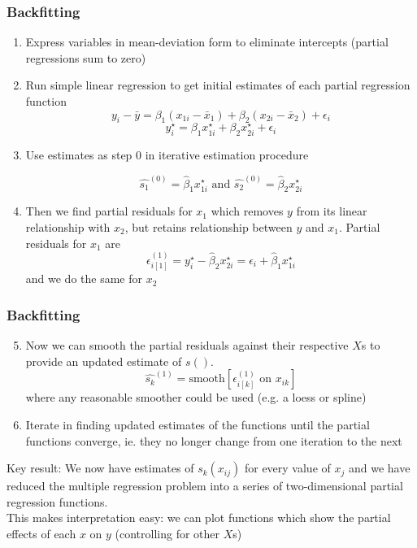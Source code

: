 \documentclass{beamer}
\numberwithin{equation}{section}
\begin{document}
 \begin{frame}[fragile]
\frametitle{Backfitting}
\small
\begin{enumerate}
  \item Express variables in mean-deviation form to eliminate intercepts (partial regressions sum to zero)
  \item Run simple linear regression to get initial estimates of each partial regression function$$
y_i -\bar{y} =  \beta_1 ( x_{1i} - \bar{x}_1 ) +  \beta_2 ( x_{2i} - \bar{x}_2 )  + \epsilon_i
  $$
  $$
  y_i^\star =  \beta_1 x_{1i}^\star  +  \beta_2 x_{2i}^\star   + \epsilon_i
  $$
 \item Use estimates as step 0 in iterative estimation procedure 
 
 $$
 \hat{s_1}^{(0)} =  \hat{\beta}_1 x_{1i}^\star \,\, \mbox{and}  \,\,   \hat{s_2}^{(0)} =  \hat{\beta}_2 x_{2i}^\star 
 $$
 \item Then we find partial residuals for $x_1$ which removes $y$ from its linear relationship with $x_2$, but retains relationship between $y$ and $x_1$. Partial residuals for $x_1$ are$$
 \epsilon_{i[1]}^{(1)}  =  y_i^\star -  \hat{\beta}_2 x_{2i}^\star = \epsilon_i + \hat{\beta}_1 x_{1i}^\star
 $$
 and we do the same for $x_2$
\end{enumerate}
\end{frame}

 \begin{frame}[fragile]
\frametitle{Backfitting}
\small
\begin{enumerate}
\setcounter{enumi}{4}
  \item Now we can smooth the partial residuals against their respective $X$s to provide an updated estimate of $s()$. $$
  \hat{s_k}^{(1)} =  \mbox{smooth} [  \epsilon_{i[k]}^{(1)} \,\, \mbox{on}   \,\, x_{ik} ] 
  $$ where any reasonable smoother could be used (e.g. a loess or spline)
  \item Iterate in finding updated estimates of the functions until the partial functions converge, ie. they no longer change from one iteration to the next
  \end{enumerate}
Key result: We now have estimates of $s_k(x_{ij})$ for every value of $x_j$ and we have reduced the multiple regression problem into a series of two-dimensional partial regression functions.\\\bigskip This makes interpretation easy: we can plot functions which show the partial effects of each $x$ on $y$ (controlling for other $X$s)
\end{frame}
\end{document}
